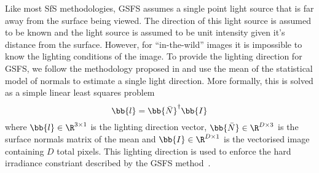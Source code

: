 Like most SfS methodologies, GSFS assumes a single point light source that
is far away from the surface being viewed. The direction of this light source
is assumed to be known and the light source is assumed to be unit intensity
given it's distance from the surface. However, for ``in-the-wild'' images
it is impossible to know the lighting conditions of the image. To provide
the lighting direction for GSFS, we follow the methodology proposed in
\citet{kemelmacher2011facereconstruction} and use the mean of the statistical
model of normals to estimate a single light direction. More formally, this is
solved as a simple linear least squares problem
\begin{equation}\label{eq:light-estimate}
    \bb{l} = \bb{{\bar{N}}}^{\dagger} \bb{I}
\end{equation}
where $\bb{l} \in \R^{3 \times 1}$ is the lighting direction vector,
$\bb{{\bar{N}}} \in \R^{D \times 3}$ is the surface normals matrix of the mean
and $\bb{I} \in \R^{D \times 1}$ is the vectorised image containing $D$ total
pixels. This lighting direction is used to enforce the hard irradiance constriant
described by the GSFS method~\cite{smith2006recovering}.
{
}

